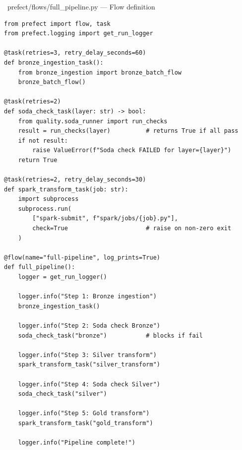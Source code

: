 \documentclass[12pt, a4paper]{article}
\begin{document}
\begin{codebox}{\faCode\ prefect/flows/full\_pipeline.py --- Flow definition}
\begin{verbatim}
from prefect import flow, task
from prefect.logging import get_run_logger

@task(retries=3, retry_delay_seconds=60)
def bronze_ingestion_task():
    from bronze_ingestion import bronze_batch_flow
    bronze_batch_flow()

@task(retries=2)
def soda_check_task(layer: str) -> bool:
    from quality.soda_runner import run_checks
    result = run_checks(layer)          # returns True if all pass
    if not result:
        raise ValueError(f"Soda check FAILED for layer={layer}")
    return True

@task(retries=2, retry_delay_seconds=30)
def spark_transform_task(job: str):
    import subprocess
    subprocess.run(
        ["spark-submit", f"spark/jobs/{job}.py"],
        check=True                      # raise on non-zero exit
    )

@flow(name="full-pipeline", log_prints=True)
def full_pipeline():
    logger = get_run_logger()

    logger.info("Step 1: Bronze ingestion")
    bronze_ingestion_task()

    logger.info("Step 2: Soda check Bronze")
    soda_check_task("bronze")           # blocks if fail

    logger.info("Step 3: Silver transform")
    spark_transform_task("silver_transform")

    logger.info("Step 4: Soda check Silver")
    soda_check_task("silver")

    logger.info("Step 5: Gold transform")
    spark_transform_task("gold_transform")

    logger.info("Pipeline complete!")
\end{verbatim}
\end{codebox}

\vspace{0.5em}
\end{document}
